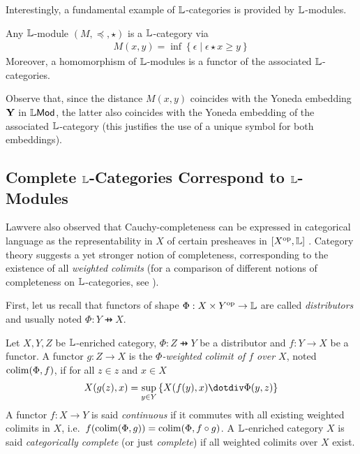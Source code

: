 Interestingly, a fundamental example of $\mathbb{L}$-categories is provided by $\mathbb{L}$-modules. 

\begin{proposition}
Any $\mathbb{L}$-module $(M,\preceq, \star)$ is a $\mathbb{L}$-category via
\begin{align}
M(x,y) = \inf\left\{ \epsilon \mid \epsilon \star x\geq y\right\}
\end{align}
Moreover, a homomorphism of $\mathbb{L}$-modules is a functor of the associated $\mathbb{L}$-categories.
\end{proposition}

Observe that, since the distance $M(x,y)$ coincides with the Yoneda embedding $\mathbf{Y}$ in $\mathbb{L}\mathsf{Mod}$, the latter also coincides with the Yoneda embedding of the associated $\mathbb{L}$-category (this justifies the use of a unique symbol for both embeddings).


\subsection{Complete $\mathbb{L}$-Categories Correspond to $\mathbb{L}$-Modules}

Lawvere also observed that Cauchy-completeness can be expressed in categorical language as the representability in $X$ of certain presheaves in $[X^{\mathrm{op}},\mathbb{L}]$ \cite{Lawvere1973}. Category theory suggests a yet stronger notion of completeness, corresponding to the existence of all \emph{weighted colimits} (for a comparison of different notions of completeness on $\mathbb{L}$-categories, see \cite{}).

First, let us recall that functors of shape $\Phi: X\times Y^{\mathrm{op}}\to \mathbb{L}$ are called \emph{distributors} and usually noted $\Phi: Y \pfun X$.


\begin{definition}
Let $X,Y,Z$ be $\mathbb{L}$-enriched category,
$\Phi: Z\pfun Y$ be a distributor and  $f:Y\to X$ be a functor.
A functor $g:Z\to X$ is the \emph{$\Phi$-weighted colimit of $f$ over $X$}, noted $\mathrm{colim}(\Phi,f)$, if for all $z\in z$ and $x\in X$
\begin{align}
X(g(z),x)= \sup_{y\in Y}\left\{X(f(y),x)\menus \Phi(y,z)\right\}
\end{align} 
A functor $f:X\to Y$ is said \emph{continuous} if it commutes with all existing weighted colimits in $X$, i.e.~$f(\mathrm{colim}(\Phi,g))=\mathrm{colim}(\Phi,f\circ g)$. A $\mathbb{L}$-enriched category 
$X$ is said \emph{categorically complete} (or just \emph{complete}) if all weighted colimits over $X$ exist. 
\end{definition}


